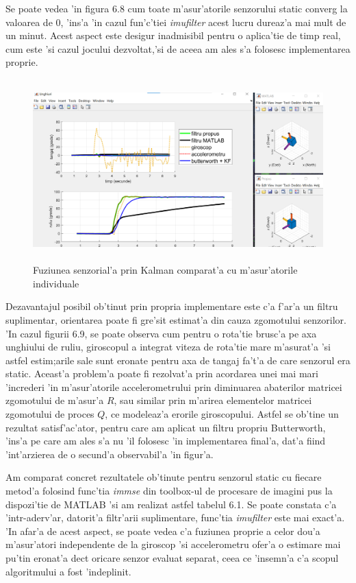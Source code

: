 \documentclass[12pt,a4paper,twoside]{report}
\begin{document}
Se poate vedea 'in figura 6.8 cum toate m'asur'atorile senzorului static converg la valoarea de 0, 'ins'a 'in cazul fun'c'tiei \textit{imufilter} acest lucru dureaz'a mai mult de un minut. Acest aspect este desigur inadmisibil pentru o aplica'tie de timp real, cum este 'si cazul jocului dezvoltat,'si de aceea am ales s'a folosesc implementarea proprie. 

\begin{figure}[H]
\centering
 \includegraphics[width=150mm,height=70mm,]{img/comp}
 \caption{Fuziunea senzorial'a prin Kalman comparat'a cu m'asur'atorile individuale}
\end{figure}

Dezavantajul posibil ob'tinut prin propria implementare este c'a f'ar'a un filtru suplimentar, orientarea poate fi gre'sit estimat'a din cauza zgomotului senzorilor. 'In cazul figurii 6.9, se poate observa cum pentru o rota'tie brusc'a pe axa unghiului de ruliu, giroscopul a integrat viteza de rota'tie mare m'asurat'a 'si astfel estim;arile sale sunt eronate pentru axa de tangaj fa't'a de care senzorul era static. Aceast'a problem'a poate fi rezolvat'a prin acordarea unei mai mari 'increderi 'in m'asur'atorile accelerometrului prin diminuarea abaterilor matricei zgomotului de m'asur'a $R$, sau similar prin m'arirea elementelor matricei zgomotului de proces $Q$, ce modeleaz'a erorile giroscopului. Astfel se ob'tine un rezultat satisf'ac'ator, pentru care am aplicat un filtru propriu Butterworth, 'ins'a pe care am ales s'a nu 'il folosesc 'in implementarea final'a, dat'a fiind 'int'arzierea de o secund'a observabil'a 'in figur'a. 

\vspace{5px}


Am comparat concret rezultatele ob'tinute pentru senzorul static cu fiecare metod'a folosind func'tia \textit{immse} \cite{immse} din toolbox-ul de procesare de imagini pus la dispozi'tie de MATLAB 'si am realizat astfel tabelul 6.1. Se poate constata c'a 'intr-aderv'ar, datorit'a filtr'arii suplimentare, func'tia \textit{imufilter} este mai exact'a. 'In afar'a de acest aspect, se poate vedea c'a fuziunea proprie a celor dou'a m'asur'atori independente de la giroscop 'si accelerometru ofer'a o estimare mai pu'tin eronat'a dec\ia t oricare senzor evaluat separat, ceea ce 'insemn'a c'a scopul algoritmului a fost 'indeplinit. 
\end{document}
